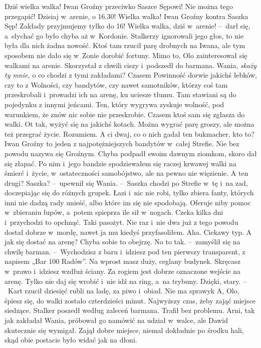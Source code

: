 \documentclass[../MAIN.tex]{subfiles}
\begin{document}
\sx Dziś wielka walka! Iwan Groźny przeciwko Saszce Sępowi! Nie można tego przegapić! Dzisiaj w~arenie, o 16.30! Wielka walka! Iwan Groźny kontra Saszka Sęp! Zakłady przyjmujemy tylko do 16! Wielka walka, dziś w~arenie! --~darł się, a~słychać go było chyba aż w~Kordonie. Stalkerzy ignorowali jego głos, to nie była dla nich żadna nowość. Ktoś tam rzucił parę drobnych na Iwana, ale tym sposobem nie dało się w~Zonie dorobić fortuny.
\qd
\hspace{12.4em}Mimo to, Olo zainteresował się walkami na arenie. Skorzystał z chwili ciszy i~podszedł do barmana.
\sx Wania, \textit{skaży ty mnie,} o co chodzi z tymi zakładami?
\xx Czasem Powinność dorwie jakichś łebków, czy to z Wolności, czy bandytów, czy nawet samotników, którzy coś tam przeskrobali i~prowadzi ich na arenę, ku uciesze tłumu. Tam stawiani są do pojedynku z innymi jeńcami. Ten, który wygrywa zyskuje wolność, pod warunkiem, że znów nic sobie nie przeskrobie. Czasem ktoś sam się zgłasza do walki. Ot tak, wyżyć się na jakichś kotach. Można wygrać parę groszy, ale można też przegrać życie.
\xx Rozumiem. A ci dwaj, co o nich gadał ten bukmacher, kto to?
\xx Iwan Groźny to jeden z najpotężniejszych bandytów w~całej Strefie. Nie bez powodu nazywa się Groźnym. Chyba podpadł swoim dawnym ziomkom, skoro dał się złapać. Po nim i~jego bandzie spodziewałem się raczej krwawej walki na śmierć i~życie, w~ostateczności samobójstwo, ale na pewno nie więzienie.
\xx A ten drugi?
\xx Saszka? --~upewnił się Wania. --~Saszka chodzi po Strefie w~tę i~na zad, doczepiając się do różnych grupek. Łazi i~nic nie robi, tylko zbiera fanty, których inni nie dadzą rady unieść, albo które im się nie spodobają. Oferuje niby pomoc w~zbieraniu łupów, a~potem spieprza ile sił w~nogach. Czeka kilka dni i~przychodzi to opchnąć. Taki pasożyt. Nie raz i~nie dwa już z tego powodu dostał dobrze w~mordę, nawet ja mu kiedyś przyfasoliłem.
\xx Aha. Ciekawy typ. A jak się dostać na arenę? Chyba sobie to obejrzę.
\xx No to tak. --~zamyślił się na chwilę barman. --~Wychodzisz z baru i~idziesz pod ten pierwszy transparent, z napisem „Bar 100 Radów”. Na wprost masz duży, ceglany budynek. Skręcasz w~prawo i~idziesz wzdłuż ściany. Za rogiem jest dobrze oznaczone wejście na arenę. Tylko nie daj się wrobić i~nie idź na ring, a~na trybuny.
\xx Dzięki, stary. --~Kart rzucił dziesięć rubli na ladę, za piwo i~obiad.
\xx Nie ma sprawy\3k A, Olo, śpiesz się, do walki zostało czterdzieści minut. Najwyższy czas, żeby zająć miejsce siedzące.
\qd \mm
Stalker poszedł według zaleceń barmana. Trafił bez problemu. Arni, tak jak zakładał Wania, próbował go namówić na udział w~walce, ale Dawid skutecznie się wymigał. Zajął dobre miejsce, niemal dokładnie po środku hali, skąd obie postacie było widać jak na dłoni.
\end{document}
